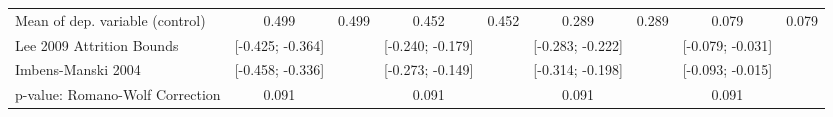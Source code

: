 {\begin{tabular}{l*{8}{c}}
Mean of dep. variable (control)                   &       0.499         &       0.499         &       0.452         &       0.452         &       0.289         &       0.289         &       0.079         &       0.079         \\
Lee 2009 Attrition Bounds                         &[-0.425; -0.364]         &                     &[-0.240; -0.179]         &                     &[-0.283; -0.222]         &                     &[-0.079; -0.031]         &                     \\
Imbens-Manski 2004                                &[-0.458; -0.336]         &                     &[-0.273; -0.149]         &                     &[-0.314; -0.198]         &                     &[-0.093; -0.015]         &                     \\
p-value: Romano-Wolf Correction                   &       0.091         &                     &       0.091         &                     &       0.091         &                     &       0.091         &                     \\
\hline\hline
\end{tabular}
}

